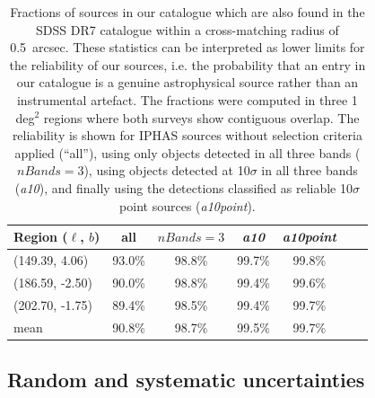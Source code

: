 \documentclass[a4paper,useAMS,usenatbib]{mn2e}
\begin{document}
{\begin{table}
    \caption{Fractions of sources in our catalogue
             which are also found in the SDSS DR7 catalogue
             within a cross-matching radius of 0.5~arcsec.
             These statistics can be interpreted
             as lower limits
             for the reliability of our sources,
             i.e. the probability that an entry in our
             catalogue is a genuine astrophysical source
             rather than an instrumental artefact.
             The fractions were computed
             in three 1 deg$^2$ regions
             where both surveys
             show contiguous overlap.
             The reliability is shown
             for IPHAS sources 
             without selection criteria applied (``all''),
             using only objects detected in all three bands ($nBands=3$),
             using objects detected at 10$\sigma$
             in all three bands (\emph{a10}),
             and finally using the detections
             classified as reliable 10$\sigma$ point sources (\emph{a10point}).
             }
    \label{tbl:reliability}
    \begin{center}
        \begin{tabular}{lcccccc}
        \toprule
        Region ($\ell$, $b$) & all & $nBands=3$ & \emph{a10} & \emph{a10point} \\
        \midrule
        (149.39, 4.06) & 93.0\% & 98.8\% & 99.7\% & 99.8\% \\
        (186.59, -2.50) & 90.0\% & 98.8\% & 99.4\% & 99.6\% \\
        (202.70, -1.75) & 89.4\% & 98.5\% &99.4\% & 99.7\% \\ \midrule
        mean & 90.8\% & 98.7\% & 99.5\% & 99.7\% \\
        \bottomrule
        \end{tabular}
    \end{center}
\end{table}

}

\subsection{Random and systematic uncertainties}
\label{sec:uncertainties}
\end{document}
